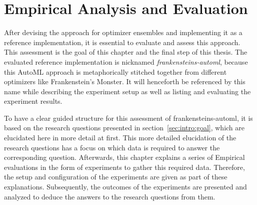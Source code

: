 %
\chapter{Empirical Analysis and Evaluation}
\label{sec:evaluation}
After devising the approach for optimizer ensembles and implementing it as a reference implementation, it is essential to evaluate and assess this approach.
This assessment is the goal of this chapter and the final step of this thesis.\newline
The evaluated reference implementation is nicknamed \textit{frankensteins-automl}, because this AutoML approach is metaphorically stitched together from different optimizers like Frankenstein's Monster.
It will henceforth be referenced by this name while describing the experiment setup as well as listing and evaluating the experiment results.

To have a clear guided structure for this assessment of frankensteins-automl, it is based on the research questions presented in section~\ref{sec:intro:goal}, which are elucidated here in more detail at first.
This more detailed elucidation of the research questions has a focus on which data is required to answer the corresponding question.\newline
Afterwards, this chapter explains a series of Empirical evaluations in the form of experiments to gather this required data.
Therefore, the setup and configuration of the experiments are given as part of these explanations.\newline
Subsequently, the outcomes of the experiments are presented and analyzed to deduce the answers to the research questions from them.

